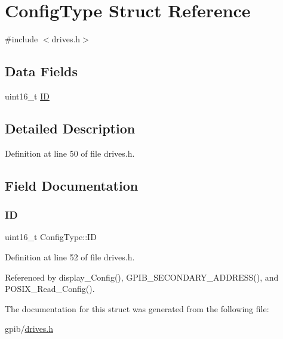 \hypertarget{structConfigType}{}\section{Config\+Type Struct Reference}
\label{structConfigType}


{\ttfamily \#include $<$drives.\+h$>$}

\subsection*{Data Fields}
\begin{DoxyCompactItemize}
\item 
uint16\+\_\+t \hyperlink{structConfigType_a7d89346361dc0f06db0917c7ff37501a}{ID}
\end{DoxyCompactItemize}


\subsection{Detailed Description}


Definition at line 50 of file drives.\+h.



\subsection{Field Documentation}
\mbox{\label{structConfigType_a7d89346361dc0f06db0917c7ff37501a}} 
\subsubsection{\texorpdfstring{ID}{ID}}
{\footnotesize\ttfamily uint16\+\_\+t Config\+Type\+::\+ID}



Definition at line 52 of file drives.\+h.



Referenced by display\+\_\+\+Config(), G\+P\+I\+B\+\_\+\+S\+E\+C\+O\+N\+D\+A\+R\+Y\+\_\+\+A\+D\+D\+R\+E\+S\+S(), and P\+O\+S\+I\+X\+\_\+\+Read\+\_\+\+Config().



The documentation for this struct was generated from the following file\+:\begin{DoxyCompactItemize}
\item 
gpib/\hyperlink{drives_8h}{drives.\+h}\end{DoxyCompactItemize}
